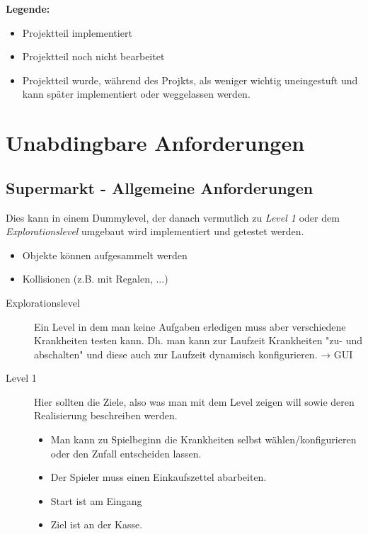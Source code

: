 ﻿\documentclass[a4paper, 11pt]{scrartcl}
\title{\documenttitle}
\author{\authors}
\date{\dateversion}
\newcommand{\fertig}{\color{ForestGreen}}
\newcommand{\unwichtig}{\color{Gray}}
\begin{document}
\maketitle

{\bfseries Legende:}
\begin{itemize}
    \item {\fertig Projektteil implementiert}
    \item {Projektteil noch nicht bearbeitet}
    \item {\unwichtig Projektteil wurde, während des Projkts, als weniger
    wichtig uneingestuft und kann später implementiert oder weggelassen werden.}
\end{itemize}

\section{Unabdingbare Anforderungen}
\subsection{Supermarkt - Allgemeine Anforderungen}
Dies kann in einem Dummylevel, der danach vermutlich zu \emph{Level 1}
oder dem \emph{Explorationslevel} umgebaut wird implementiert und
getestet werden.
\begin{itemize}
    \item Objekte können aufgesammelt werden
    \item Kollisionen (z.B. mit Regalen, ...)
\end{itemize}
%
%
\begin{description}
    \item[Explorationslevel]
    Ein Level in dem man keine Aufgaben erledigen muss aber verschiedene
    Krankheiten testen kann. Dh. man kann zur Laufzeit Krankheiten
    "zu- und abschalten" und diese auch zur Laufzeit dynamisch
    konfigurieren. → GUI
    \item[Level 1]
    Hier sollten die Ziele, also was man mit dem Level zeigen will sowie
    deren Realisierung beschreiben werden.\\
    \begin{itemize}
        \item Man kann zu Spielbeginn die Krankheiten selbst
        wählen/konfigurieren oder den Zufall entscheiden lassen.
        \item Der Spieler muss einen Einkaufszettel abarbeiten.
        \item Start ist am Eingang
        \item Ziel ist an der Kasse.
    \end{itemize}
\end{description}
\end{document}

